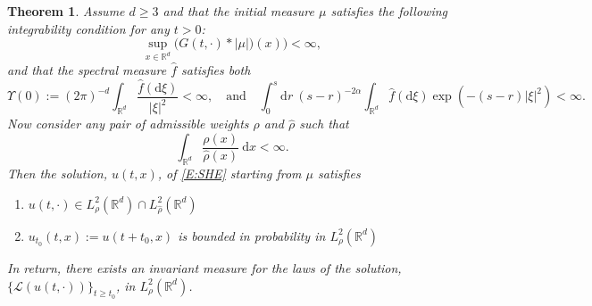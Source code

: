 \documentclass[a4paper,11pt]{article}
\numberwithin{equation}{section}
\theoremstyle{plain}
\newtheorem{theorem}{Theorem}[section]
\theoremstyle{definition}
\newcommand{\ud}{\ensuremath{\mathrm{d} }}
\newcommand{\R}{\mathbb{R}}
\numberwithin{NQ}{section}
\numberwithin{LQ}{section}
\numberwithin{ZQ}{section}
\begin{document}
	\begin{theorem}
	\label{T:InvMeasDelta}
Assume $d \ge 3$ and that the initial measure $\mu$ satisfies the following integrability condition for any $t>0$:
		\begin{equation}
		\label{A:InvAssumpMeas}
			 \sup_{x\in \R^d}	\big(G(t,\cdot)*|\mu|)(x) \big) < \infty,
		\end{equation}
and that the spectral measure $\hat{f}$ satisfies both 
		\begin{equation}
		\label{A:InvAssumpSpec}
			\Upsilon(0) := (2\pi)^{-d}\int_{\R^d}\dfrac{\hat f(\ud \xi)}{|\xi|^2} < \infty, \quad \text{and} \quad \int_0^s \ud r \: (s-r)^{-2\alpha} \int_{\R^{d}} \hat f(\ud \xi) \exp\left(-(s-r)|\xi|^2 \right) < \infty.
		\end{equation}
Now consider any pair of admissible weights $\rho$ and $\hat{\rho}$ such that
			\[
				\int_{\R^d}\dfrac{\rho(x)}{\hat\rho(x)}\: \ud x < \infty.
			\]
Then the solution, $u(t,x)$, of \eqref{E:SHE} starting from $\mu$ satisfies 
	\begin{enumerate}
		\item $u(t,\cdot) \in L^2_{\rho}(\R^d) \cap L^2_{\hat \rho}(\R^d)$
		\item $u_{t_0}(t,x) := u(t+t_0,x)$ is bounded in probability in $L^2_{\rho}(\R^d) $
	\end{enumerate} 
In return, there exists an invariant measure for the laws of the solution, $\{\mathscr L (u(t,\cdot))\}_{t \ge t_0}$,  in $L^2_\rho(\R^d)$.
	\end{theorem}
\end{document}
